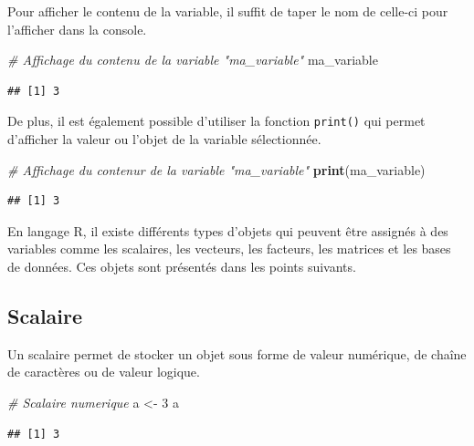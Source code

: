 \documentclass[
]{book}
\newenvironment{Shaded}{\begin{snugshade}}{\end{snugshade}}
\newcommand{\CommentTok}[1]{\textcolor[rgb]{0.56,0.35,0.01}{\textit{#1}}}
\newcommand{\DecValTok}[1]{\textcolor[rgb]{0.00,0.00,0.81}{#1}}
\newcommand{\FunctionTok}[1]{\textcolor[rgb]{0.13,0.29,0.53}{\textbf{#1}}}
\newcommand{\NormalTok}[1]{#1}
\newcommand{\OtherTok}[1]{\textcolor[rgb]{0.56,0.35,0.01}{#1}}
\begin{document}
Pour afficher le contenu de la variable, il suffit de taper le nom de celle-ci pour l'afficher dans la console.

\begin{Shaded}
\begin{Highlighting}[]
\CommentTok{\# Affichage du contenu de la variable "ma\_variable"}
\NormalTok{ma\_variable}
\end{Highlighting}
\end{Shaded}

\begin{verbatim}
## [1] 3
\end{verbatim}

De plus, il est également possible d'utiliser la fonction \texttt{print()} qui permet d'afficher la valeur ou l'objet de la variable sélectionnée.

\begin{Shaded}
\begin{Highlighting}[]
\CommentTok{\# Affichage du contenur de la variable "ma\_variable"}
\FunctionTok{print}\NormalTok{(ma\_variable)}
\end{Highlighting}
\end{Shaded}

\begin{verbatim}
## [1] 3
\end{verbatim}

En langage R, il existe différents types d'objets qui peuvent être assignés à des variables comme les scalaires, les vecteurs, les facteurs, les matrices et les bases de données. Ces objets sont présentés dans les points suivants.

\subsection{Scalaire}\label{scalaire}

Un scalaire permet de stocker un objet sous forme de valeur numérique, de chaîne de caractères ou de valeur logique.

\begin{Shaded}
\begin{Highlighting}[]
\CommentTok{\# Scalaire numerique}
\NormalTok{a }\OtherTok{\textless{}{-}} \DecValTok{3}
\NormalTok{a}
\end{Highlighting}
\end{Shaded}

\begin{verbatim}
## [1] 3
\end{verbatim}
\end{document}
